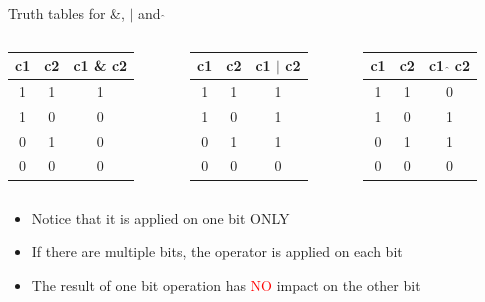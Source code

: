 \begin{frame}{Truth tables for \&, $|$ and $\hat{}$}
\begin{columns}
\begin{column}{0.32\linewidth}
\begin{table}
\begin{center}
\begin{tabular}{|c|c|c|}
\hline
c1 & c2 & c1 \& c2 \\ \hline \hline
1 & 1 & 1 \\ \hline
1 & 0 & 0 \\ \hline
0 & 1 & 0 \\ \hline
0 & 0 & 0 \\ \hline
\end{tabular}
\end{center}
\end{table}
\end{column}
\begin{column}{0.32\linewidth}
\begin{table}
\begin{center}
\begin{tabular}{|c|c|c|}
\hline
c1 & c2 & c1 $|$ c2 \\ \hline \hline
1 & 1 & 1 \\ \hline
1 & 0 & 1 \\ \hline
0 & 1 & 1 \\ \hline
0 & 0 & 0 \\ \hline
\end{tabular}
\end{center}
\end{table}
\end{column}

\begin{column}{0.32\linewidth}
\begin{table}
\begin{center}
\begin{tabular}{|c|c|c|}
\hline
c1 & c2 & c1 $\hat{}$ c2 \\ \hline \hline
1 & 1 & 0 \\ \hline
1 & 0 & 1 \\ \hline
0 & 1 & 1 \\ \hline
0 & 0 & 0 \\ \hline
\end{tabular}
\end{center}
\end{table}
\end{column}
\end{columns}
\begin{itemize}
	\item {Notice that it is applied on one bit ONLY}
	\item {If there are multiple bits, the operator is applied on each bit}
	\item {The result of one bit operation has \textcolor{red}{NO} impact on the other bit}
\end{itemize}

\end{frame}

